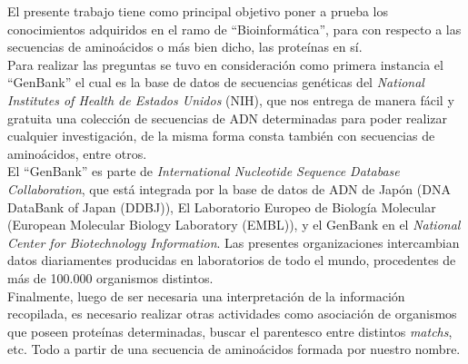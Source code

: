 El presente trabajo tiene como principal objetivo poner a prueba los conocimientos
adquiridos en el ramo de ``Bioinformática'', para con respecto  a las secuencias
de aminoácidos o más bien dicho, las proteínas en sí.\\

Para realizar las preguntas se tuvo en consideración como primera instancia el 
``GenBank'' el cual es la base de datos de secuencias genéticas del
\emph{National Institutes of Health de Estados Unidos} (NIH),
que nos entrega de manera fácil y gratuita una colección de secuencias
de ADN determinadas para poder realizar cualquier investigación,
de la misma forma consta también con secuencias de aminoácidos, entre otros.\\

El ``GenBank'' es parte de \emph{International Nucleotide Sequence Database Collaboration},
que está integrada por la base de datos de ADN de Japón (DNA DataBank of Japan (DDBJ)),
El Laboratorio Europeo de Biología Molecular (European Molecular Biology Laboratory (EMBL)),
y el GenBank en el \emph{National Center for Biotechnology Information}.
Las presentes organizaciones intercambian datos diariamentes producidas en laboratorios de
todo el mundo, procedentes de más de 100.000 organismos distintos.\\

Finalmente, luego de ser necesaria una interpretación de la información recopilada,
es necesario realizar otras actividades como asociación de organismos que poseen proteínas
determinadas, buscar el parentesco entre distintos \emph{matchs}, etc.
Todo a partir de una secuencia de aminoácidos formada por nuestro nombre.
